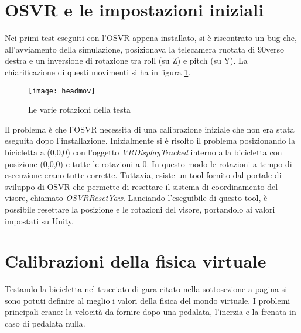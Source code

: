 \newpage
\section{OSVR e le impostazioni iniziali}
\noindent Nei primi test eseguiti con l'OSVR appena installato, si è riscontrato un bug che, all'avviamento della simulazione, posizionava la telecamera ruotata di 90\degree verso destra e un inversione di rotazione tra roll (su Z) e pitch (su Y). La chiarificazione di questi movimenti si ha in figura \ref{fig:headmov}.
\begin{figure}[htb]
    \centering
    \texttt{[image: headmov]}
    \caption{Le varie rotazioni della testa\label{fig:headmov}}
    \vspace{-0.3cm}
\end{figure}
\noindent Il problema è che l'OSVR necessita di una calibrazione iniziale che non era stata eseguita dopo l'installazione. Inizialmente si è risolto il problema posizionando la bicicletta a (0,0,0) con l'oggetto \textit{VRDisplayTracked} interno alla bicicletta con posizione (0,0,0) e tutte le rotazioni a 0. In questo modo le rotazioni a tempo di esecuzione erano tutte corrette. Tuttavia, esiste un tool fornito dal portale di sviluppo di OSVR che permette di resettare il sistema di coordinamento del visore, chiamato \textit{OSVRResetYaw}. Lanciando l'eseguibile di questo tool, è possibile resettare la posizione e le rotazioni del visore, portandolo ai valori impostati su Unity.

\section{Calibrazioni della fisica virtuale}
Testando la bicicletta nel tracciato di gara citato nella sottosezione  a pagina \pageref{ambientazione} si sono potuti definire al meglio i valori della fisica del mondo virtuale. I problemi principali erano: la velocità da fornire dopo una pedalata, l'inerzia e la frenata in caso di pedalata nulla. 

